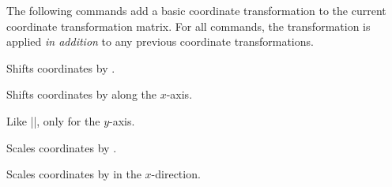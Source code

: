 The following commands add a basic coordinate transformation to the current
coordinate transformation matrix. For all commands, the transformation is
applied \emph{in addition} to any previous coordinate transformations.

\begin{command}{\pgftransformshift{}}
    Shifts coordinates by .
\begin{codeexample}[]
\end{codeexample}
\end{command}

\begin{command}{\pgftransformxshift{}}
    Shifts coordinates by  along the $x$-axis.
\begin{codeexample}[]
\end{codeexample}
\end{command}

\begin{command}{\pgftransformyshift{}}
    Like |\pgftransformxshift|, only for the $y$-axis.
\end{command}

\begin{command}{\pgftransformscale{}}
    Scales coordinates by .
\begin{codeexample}[]
\end{codeexample}
\end{command}

\begin{command}{\pgftransformxscale{}}
    Scales coordinates by  in the $x$-direction.
\begin{codeexample}[]
\end{codeexample}
\end{command}

